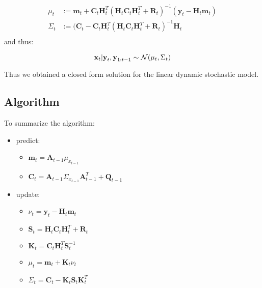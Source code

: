 \documentclass[
]{article}
\providecommand{\tightlist}{%
  \setlength{\itemsep}{0pt}\setlength{\parskip}{0pt}}
\begin{document}
\[
\begin{align*}
    \mu_t& := \textbf{m}_t + \textbf{C}_t\textbf{H}_{t}^T(\textbf{H}_t\textbf{C}_t\textbf{H}_t^T + \textbf{R}_{t})^{-1}(\textbf{y}_t - \textbf{H}_{t}\textbf{m}_t) \\
    \Sigma_t&:= (\textbf{C}_t - \textbf{C}_t\textbf{H}_{t}^T(\textbf{H}_t\textbf{C}_t\textbf{H}_t^T + \textbf{R}_{t})^{-1}\textbf{H}_{t} \\
\end{align*}    
\] and thus:

\[
\begin{equation}
    \textbf{x}_t|\textbf{y}_t, \textbf{y}_{1:t-1} \sim \mathcal{N}(\mu_t, \Sigma_t) \\
\end{equation}
\]

Thus we obtained a closed form solution for the linear dynamic
stochastic model.

\hypertarget{algorithm}{%
\subsection{Algorithm}\label{algorithm}}

To summarize the algorithm:

\begin{itemize}
\tightlist
\item
  predict:

  \begin{itemize}
  \tightlist
  \item
    \(\textbf{m}_t =\textbf{A}_{t-1}\mu_{x_{t-1}}\)
  \item
    \(\textbf{C}_t = \textbf{A}_{t-1}\Sigma_{x_{t-1}}\textbf{A}_{t-1}^T + \textbf{Q}_{t-1}\)
  \end{itemize}
\item
  update:

  \begin{itemize}
  \tightlist
  \item
    \(\nu_t = \textbf{y}_t - \textbf{H}_{t}\textbf{m}_t\)
  \item
    \(\textbf{S}_t = \textbf{H}_t\textbf{C}_t\textbf{H}_t^T + \textbf{R}_{t}\)
  \item
    \(\textbf{K}_t = \textbf{C}_t\textbf{H}_{t}^T\textbf{S}_t^{-1}\)
  \item
    \(\mu_t = \textbf{m}_t + \textbf{K}_t\nu_t\)
  \item
    \(\Sigma_t = \textbf{C}_t-\textbf{K}_t\textbf{S}_t\textbf{K}_t^T\)
  \end{itemize}
\end{itemize}
\end{document}

